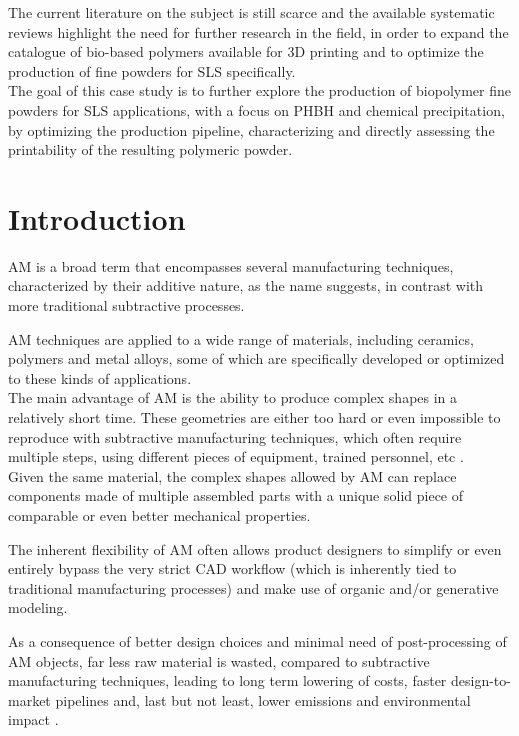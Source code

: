 \documentclass{article}
\begin{document}
    The current literature on the subject is still scarce and the available systematic reviews highlight the need for further research in the field, 
    in order to expand the catalogue of bio-based polymers available for 3D printing and to optimize the production of fine powders
    for SLS specifically. \\

    The goal of this case study is to further explore the production of biopolymer fine powders for SLS applications, with a focus on 
    PHBH and chemical precipitation, by optimizing the production pipeline, characterizing and directly assessing 
    the printability of the resulting polymeric powder. \\  

    \clearpage
    \section{Introduction\label{Intro}}

    AM is a broad term that encompasses several manufacturing techniques, characterized by their additive nature, as the name suggests, 
    in contrast with more traditional subtractive processes.
    
    AM techniques are applied to a wide range of materials, including ceramics, polymers and metal alloys, some of which are specifically developed or optimized to 
    these kinds of applications. \\ 
    
    The main advantage of AM is the ability to produce complex shapes in a relatively short time. 
    These geometries are either too hard or even impossible to reproduce with subtractive manufacturing techniques, which often require multiple steps, using different 
    pieces of equipment, trained personnel, etc \autocites{DechetMaximilianA2020OtDo}. \\

    Given the same material, the complex shapes allowed by AM can replace components made of multiple assembled parts with a unique solid piece of comparable or even better mechanical properties. 
    
    The inherent flexibility of AM often allows product designers to simplify or even entirely bypass the very strict CAD workflow (which is inherently tied to 
    traditional manufacturing processes) and make use of organic and/or generative modeling. 

    As a consequence of better design choices and minimal need of post-processing of AM objects, far less raw material is wasted, compared to subtractive manufacturing techniques, leading to 
    long term lowering of costs, faster design-to-market pipelines and, last but not least, lower emissions and environmental impact \autocite*{Recent_progress_polymers_AM}. 
\end{document}

